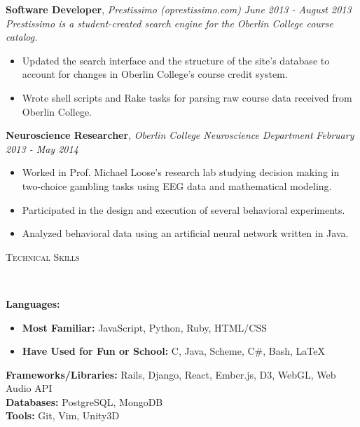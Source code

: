 \documentclass[9pt]{article}
\newenvironment{changemargin}[2]{%
  \begin{list}{}{%
    \setlength{\topsep}{0pt}%
    \setlength{\leftmargin}{#1}%
    \setlength{\rightmargin}{#2}%
    \setlength{\listparindent}{\parindent}%
    \setlength{\itemindent}{\parindent}%
    \setlength{\parsep}{\parskip}%
  }%
  \item[]}{\end{list}
}
\newcommand{\lineover}{
	\begin{changemargin}{-0.05in}{-0.05in}
		\vspace*{-8pt}
		\hrulefill \\
		\vspace*{-2pt}
	\end{changemargin}
}
\newcommand{\header}[1]{
	\begin{changemargin}{-0.5in}{-0.5in}
		\scshape{#1}\\
  	\lineover
	\end{changemargin}
}
\newenvironment{body} {
	\vspace*{-16pt}
	\begin{changemargin}{-0.25in}{-0.5in}
  }	
	{\end{changemargin}
}
\begin{document}
\begin{body}
	\textbf{Software Developer}, \emph{Prestissimo (oprestissimo.com)} \hfill \emph{June 2013 - August 2013}\\
	\emph{Prestissimo is a student-created search engine for the Oberlin College course catalog.}
	\vspace*{-4pt}
	\begin{itemize} \itemsep -0pt  %
		\item Updated the search interface and the structure of the site's database to account for changes in Oberlin College's course credit system.
		\item Wrote shell scripts and Rake tasks for parsing raw course data received from Oberlin College.
	\end{itemize}

	\textbf{Neuroscience Researcher}, \emph{Oberlin College Neuroscience Department} \hfill \emph{February 2013 - May 2014}\\
	\vspace*{-4pt}
	\begin{itemize} \itemsep -0pt  %
		\item Worked in Prof. Michael Loose's research lab studying decision making in two-choice gambling tasks using EEG data and mathematical modeling.
		\item Participated in the design and execution of several behavioral experiments.
		\item Analyzed behavioral data using an artificial neural network written in Java.
	\end{itemize}
\end{body}

\smallskip

\header{Technical Skills}

\begin{body}
	\vspace{14pt}
	\textbf{Languages:}{} 
		\begin{itemize} \itemsep -0pt  %
			\item \textbf{Most Familiar:} JavaScript, Python, Ruby, HTML/CSS
			\item \textbf{Have Used for Fun or School:} C, Java, Scheme, C\#, Bash, \LaTeX \\
		\end{itemize}
	\smallskip
	\textbf{Frameworks/Libraries:}{} Rails, Django, React, Ember.js, D3, WebGL, Web Audio API \\
	\smallskip
	\textbf{Databases:}{} PostgreSQL, MongoDB \\
	\smallskip
	\textbf{Tools:}{} Git, Vim, Unity3D \\
\end{body}
\end{document}
